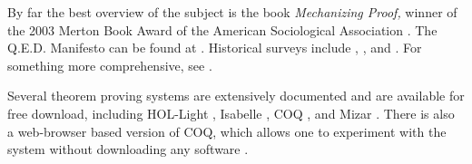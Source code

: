 \documentclass{llncs}
\begin{document}
By far the best overview of the subject is the book {\it Mechanizing Proof,}  winner of the 2003 Merton Book Award of
the American Sociological Association \cite{Mac}.
The Q.E.D. Manifesto can be found at \cite{QED}.
Historical surveys include \cite{Bled},
\cite{Ha07}, and
\cite{Mu}.
For something more comprehensive, see \cite{Ha08}.


Several theorem proving systems are extensively documented and are available for free download,
including HOL-Light \cite{HOLL}, Isabelle \cite{Isa}, COQ \cite{COQ},
and Mizar \cite{Mizar}.  There is also a web-browser based version
of COQ, which allows one to experiment with the system without
downloading any software \cite{PW}.
\end{document}
